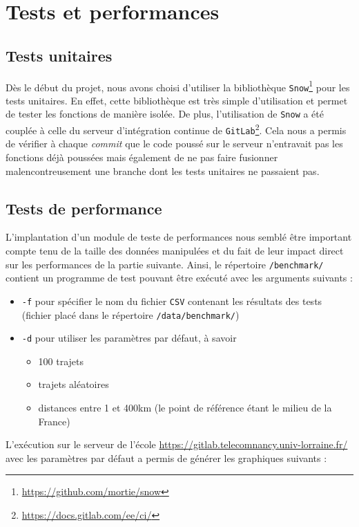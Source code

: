 \documentclass[a4paper, 12pt]{report}
\begin{document}
\section{Tests et performances}
\subsection{Tests unitaires}
Dès le début du projet, nous avons choisi d'utiliser la bibliothèque \texttt{Snow}\footnote{\url{https://github.com/mortie/snow}} pour les tests unitaires. En effet, cette bibliothèque est très simple d'utilisation et permet de tester les fonctions de  manière isolée. De plus, l'utilisation de \texttt{Snow} a été couplée à celle du serveur d'intégration continue de \texttt{GitLab}\footnote{\url{https://docs.gitlab.com/ee/ci/}}. Cela nous a permis de vérifier à chaque \textit{commit} que le code poussé sur le serveur n'entravait pas les fonctions déjà poussées mais également de ne pas faire fusionner malencontreusement une branche dont les tests unitaires ne passaient pas.\par\bigskip
\subsection{Tests de performance}
L'implantation d'un module de teste de performances nous semblé être important compte tenu de la taille des données manipulées et du fait de leur impact direct sur les performances de la partie suivante. Ainsi, le répertoire \texttt{/benchmark/} contient un programme de test pouvant être exécuté avec les arguments suivants :
\begin{itemize}
    \item \texttt{-f} pour spécifier le nom du fichier \texttt{CSV} contenant les résultats des tests (fichier placé dans le répertoire \texttt{/data/benchmark/})
    \item \texttt{-d} pour utiliser les paramètres par défaut, à savoir
          \begin{itemize}
              \item 100 trajets
              \item trajets aléatoires
              \item distances entre 1 et 400km (le point de référence étant le milieu de la France)
          \end{itemize}
\end{itemize}
L'exécution sur le serveur de l'école \url{https://gitlab.telecomnancy.univ-lorraine.fr/} avec les paramètres par défaut a permis de générer les graphiques suivants :
\begin{figure}[H]
    \centering
\end{figure}
\end{document}
